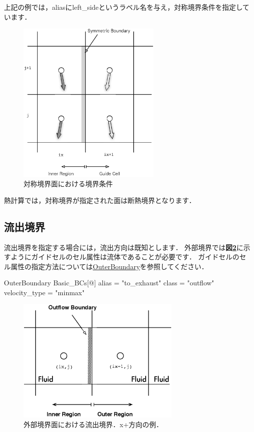 上記の例では，aliasにleft\_sideというラベル名を与え，対称境界条件を指定しています．

\begin{figure}[htbp]
\begin{center}
\includegraphics[width=7cm,clip]{symmetric.eps}
\end{center}
\caption{対称境界面における境界条件}
\label{fig:symmetric plane}
\end{figure}

熱計算では，対称境界が指定された面は断熱境界となります．


\pagebreak
\subsection{流出境界}

流出境界を指定する場合には，流出方向は既知とします．
外部境界では\textbf{図\ref{fig:outflow BC outer}}に示すようにガイドセルのセル属性は流体であることが必要です．
ガイドセルのセル属性の指定方法については\hyperlink{tgt:outer_boundary}{OuterBoundary}を参照してください．

{\small
\begin{program}
OuterBoundary {
  Basic_BCs[@] {
    alias    = "to_exhaust"
    class    = "outflow"
    velocity_type = "minmax"
  }
}
\end{program}
}

\begin{figure}[htbp]
\begin{center}
\includegraphics[width=8cm,clip]{outflowBC_outer.eps}
\end{center}
\caption{外部境界面における流出境界．x+方向の例．}
\label{fig:outflow BC outer}
\end{figure}

